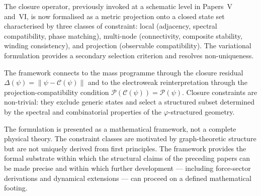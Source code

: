 \documentclass[12pt]{article}
\newcommand{\Ccal}{\mathcal{C}}
\newcommand{\Pcal}{\mathcal{P}}
\newcommand{\phig}{\varphi}
\begin{document}
The closure operator, previously invoked at a schematic level in Papers~V and~VI, is now formalised as a metric projection onto a closed state set characterised by three classes of constraint: local (adjacency, spectral compatibility, phase matching), multi-node (connectivity, composite stability, winding consistency), and projection (observable compatibility). The variational formulation provides a secondary selection criterion and resolves non-uniqueness.

The framework connects to the mass programme through the closure residual $\Delta(\psi) = \|\psi - \Ccal(\psi)\|$ and to the electroweak reinterpretation through the projection-compatibility condition $\Pcal(\Ccal(\psi)) = \Pcal(\psi)$. Closure constraints are non-trivial: they exclude generic states and select a structured subset determined by the spectral and combinatorial properties of the $\phig$-structured geometry.

The formulation is presented as a mathematical framework, not a complete physical theory. The constraint classes are motivated by graph-theoretic structure but are not uniquely derived from first principles. The framework provides the formal substrate within which the structural claims of the preceding papers can be made precise and within which further development --- including force-sector derivations and dynamical extensions --- can proceed on a defined mathematical footing.



\end{document}
